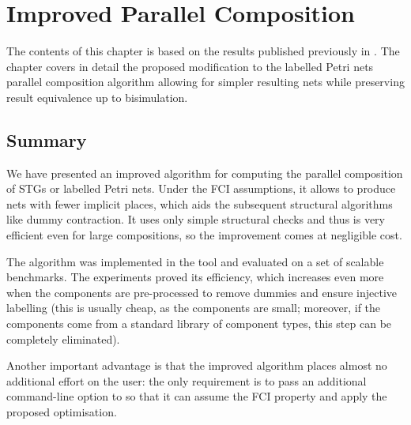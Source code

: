 \chapter{Improved Parallel Composition}

\label{chap:ParComp}

The contents of this chapter is based on the results published previously in \cite{improved_par_comp}. The chapter covers in detail the proposed modification to the labelled Petri nets parallel composition algorithm allowing for simpler resulting nets while preserving result equivalence up to bisimulation.





\section{Summary}

We have presented an improved algorithm for computing the
parallel composition of STGs or labelled Petri nets. Under the
FCI assumptions, it allows to produce nets with fewer implicit
places, which aids the subsequent structural algorithms like
dummy contraction. It uses only simple structural checks and
thus is very efficient even for large compositions, so the
improvement comes at negligible cost.

The algorithm was implemented in the \pcomp tool and evaluated
on a set of scalable benchmarks. The experiments proved its
efficiency, which increases even more when the components are
pre-processed to remove dummies and ensure injective labelling
(this is usually cheap, as the components are small; moreover,
if the components come from a standard library of component
types, this step can be completely eliminated).

Another important advantage is that the improved algorithm
places almost no additional effort on the user: the only
requirement is to pass an additional command-line option to
\pcomp so that it can assume the FCI property and apply the
proposed optimisation.
